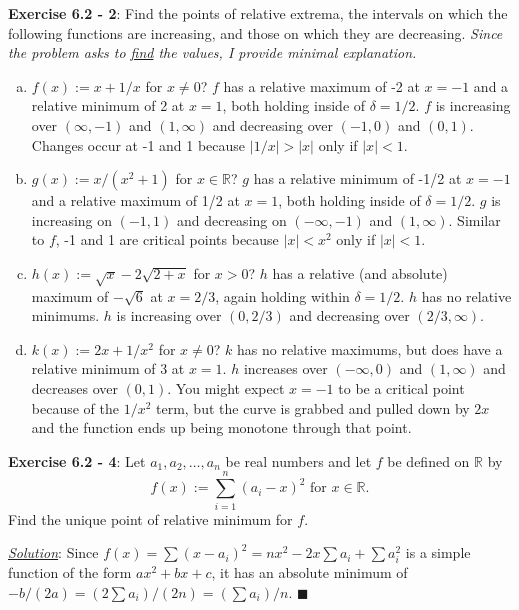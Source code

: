 \documentclass{article}
\begin{document}
\hrulefill

\textbf{Exercise 6.2 - 2}: Find the points of relative extrema, the
intervals on which the following functions are increasing, and those on
which they are decreasing. \textit{Since the problem asks to
\underline{find} the values, I provide minimal explanation.}
\begin{enumerate}[(a)]
  \item $f(x):=x+1/x$ for $x\not=0$? $f$ has a relative maximum of -2 at
    $x=-1$ and a relative minimum of 2 at $x=1$, both holding inside of 
    $\delta=1/2$.  $f$ is increasing over $(\infty,-1)$ and $(1,\infty)$
    and decreasing over $(-1,0)$ and $(0,1)$. Changes occur at -1 and 1
    because $|1/x|>|x|$ only if $|x|<1$.
  \item $g(x):=x/(x^2+1)$ for $x\in\mathbb{R}$? $g$ has a relative minimum
    of -1/2 at $x=-1$ and a relative maximum of 1/2 at $x=1$, both holding
    inside of $\delta=1/2$. $g$ is increasing on $(-1,1)$ and decreasing on
    $(-\infty,-1)$ and $(1,\infty)$. Similar to $f$, -1 and 1 are critical
    points because $|x|<x^2$ only if $|x|<1$.
  \item $h(x):=\sqrt x-2\sqrt{2+x}$ for $x>0$? $h$ has a relative (and
    absolute) maximum of $-\sqrt6$ at $x=2/3$, again holding within
    $\delta=1/2$. $h$ has no relative minimums.
    $h$ is increasing over $(0,2/3)$ and decreasing over $(2/3,\infty)$.
  \item $k(x):=2x+1/x^2$ for $x\not=0$?
    $k$ has no relative maximums, but does have a relative minimum of 3 at
    $x=1$. $h$ increases over $(-\infty,0)$ and $(1,\infty)$ and decreases
    over $(0,1)$. You might expect $x=-1$ to be a critical point because
    of the $1/x^2$ term, but the curve is grabbed and pulled down by $2x$
    and the function ends up being monotone through that point.
\end{enumerate}

\hrulefill

\textbf{Exercise 6.2 - 4}: Let $a_1,a_2,\dots,a_n$ be real numbers and let 
$f$ be defined on $\mathbb R$ by
\[f(x):=\sum_{i=1}^n(a_i-x)^2\text{\ for\ }x\in\mathbb R.\]
Find the unique point of relative minimum for $f$.

\underline{\textit{Solution}}:
Since $f(x)=\sum(x-a_i)^2=nx^2-2x\sum a_i+\sum a^2_i$ is a simple
function of the form $ax^2+bx+c$, it has an absolute minimum of
$-b/(2a)=(2\sum a_i)/(2n)=(\sum a_i)/n$.
\hfill $\blacksquare$

\hrulefill
\end{document}
